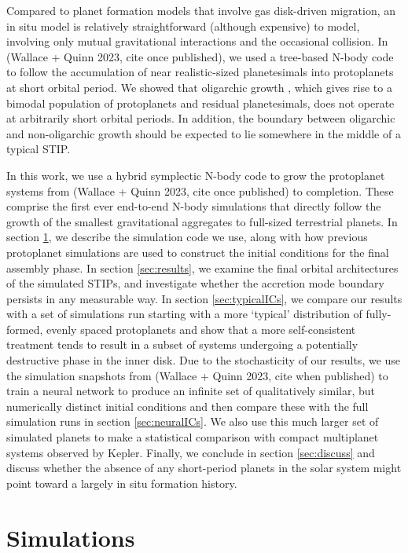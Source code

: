 Compared to planet formation models that involve gas disk-driven migration, an in situ model is relatively straightforward 
(although expensive) to model, involving only mutual gravitational interactions and the occasional collision. In (Wallace + Quinn 
2023, cite once published), we used a tree-based N-body code to follow the accumulation of near realistic-sized planetesimals 
into protoplanets at short orbital period. We showed that oligarchic growth \cite{kokubo98}, which gives rise to a bimodal 
population of protoplanets and residual planetesimals, does not operate at arbitrarily short orbital periods. In addition, the 
boundary between oligarchic and non-oligarchic growth should be expected to lie somewhere in the middle of a typical STIP.

In this work, we use a hybrid symplectic N-body code to grow the protoplanet systems from (Wallace + Quinn 2023, cite once 
published) to completion. These comprise the first ever end-to-end N-body simulations that directly follow the growth of the 
smallest gravitational aggregates to full-sized terrestrial planets. In section \ref{sec:simulations}, we describe the simulation code 
we use, along with how previous protoplanet simulations are used to construct the initial conditions for the final assembly phase. In 
section \ref{sec:results}, we examine the final orbital architectures of the simulated STIPs, and investigate whether the accretion 
mode boundary persists in any measurable way. In section \ref{sec:typicalICs}, we compare our results with a set of simulations 
run starting with a more `typical' distribution of fully-formed, evenly spaced protoplanets and show that a more self-consistent 
treatment tends to result in a subset of systems undergoing a potentially destructive phase in the inner disk. Due to the 
stochasticity of our results, we use the simulation snapshots from (Wallace + Quinn 2023, cite when published) to train a neural 
network to produce an infinite set of qualitatively similar, but numerically distinct initial conditions and then compare these with the 
full simulation runs in section \ref{sec:neuralICs}. We also use this much larger set of simulated planets to make a statistical 
comparison with compact multiplanet systems observed by Kepler. Finally, we conclude in section \ref{sec:discuss} and discuss 
whether the absence of any short-period planets in the solar system might point toward a largely in situ formation history.

\section{Simulations} \label{sec:simulations}

